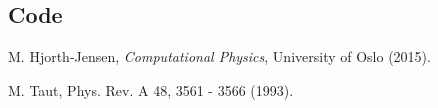 \documentclass[11pt]{article}
\begin{document}
\subsection{Code}

    

    

    

    

\begin{thebibliography}{1}

    M. Hjorth-Jensen, {\em Computational Physics}, University of Oslo (2015). 

 M. Taut, Phys. Rev. A 48, 3561 - 3566 (1993).

\end{thebibliography}
\end{document}
